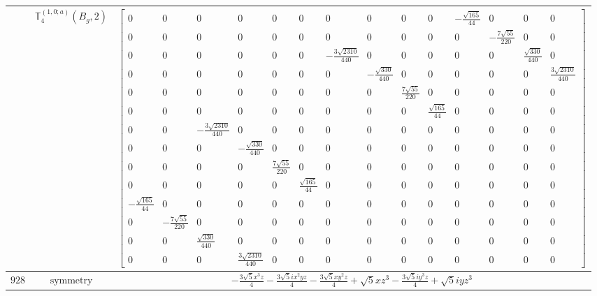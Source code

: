 \documentclass[fleqn,8pt,landscape]{jsarticle}
\begin{document}
\begin{longtable}{ccc}
$  $ & $ \mathbb{T}_{4}^{(1,0;a)}(B_{g},2) $ & $ \begin{bmatrix} 0 & 0 & 0 & 0 & 0 & 0 & 0 & 0 & 0 & 0 & - \frac{\sqrt{165}}{44} & 0 & 0 & 0 \\ 0 & 0 & 0 & 0 & 0 & 0 & 0 & 0 & 0 & 0 & 0 & - \frac{7 \sqrt{55}}{220} & 0 & 0 \\ 0 & 0 & 0 & 0 & 0 & 0 & - \frac{3 \sqrt{2310}}{440} & 0 & 0 & 0 & 0 & 0 & \frac{\sqrt{330}}{440} & 0 \\ 0 & 0 & 0 & 0 & 0 & 0 & 0 & - \frac{\sqrt{330}}{440} & 0 & 0 & 0 & 0 & 0 & \frac{3 \sqrt{2310}}{440} \\ 0 & 0 & 0 & 0 & 0 & 0 & 0 & 0 & \frac{7 \sqrt{55}}{220} & 0 & 0 & 0 & 0 & 0 \\ 0 & 0 & 0 & 0 & 0 & 0 & 0 & 0 & 0 & \frac{\sqrt{165}}{44} & 0 & 0 & 0 & 0 \\ 0 & 0 & - \frac{3 \sqrt{2310}}{440} & 0 & 0 & 0 & 0 & 0 & 0 & 0 & 0 & 0 & 0 & 0 \\ 0 & 0 & 0 & - \frac{\sqrt{330}}{440} & 0 & 0 & 0 & 0 & 0 & 0 & 0 & 0 & 0 & 0 \\ 0 & 0 & 0 & 0 & \frac{7 \sqrt{55}}{220} & 0 & 0 & 0 & 0 & 0 & 0 & 0 & 0 & 0 \\ 0 & 0 & 0 & 0 & 0 & \frac{\sqrt{165}}{44} & 0 & 0 & 0 & 0 & 0 & 0 & 0 & 0 \\ - \frac{\sqrt{165}}{44} & 0 & 0 & 0 & 0 & 0 & 0 & 0 & 0 & 0 & 0 & 0 & 0 & 0 \\ 0 & - \frac{7 \sqrt{55}}{220} & 0 & 0 & 0 & 0 & 0 & 0 & 0 & 0 & 0 & 0 & 0 & 0 \\ 0 & 0 & \frac{\sqrt{330}}{440} & 0 & 0 & 0 & 0 & 0 & 0 & 0 & 0 & 0 & 0 & 0 \\ 0 & 0 & 0 & \frac{3 \sqrt{2310}}{440} & 0 & 0 & 0 & 0 & 0 & 0 & 0 & 0 & 0 & 0 \end{bmatrix} $ \\ \hline
$ 928 $ & $ \text{symmetry} $ & $ - \frac{3 \sqrt{5} x^{3} z}{4} - \frac{3 \sqrt{5} i x^{2} y z}{4} - \frac{3 \sqrt{5} x y^{2} z}{4} + \sqrt{5} x z^{3} - \frac{3 \sqrt{5} i y^{3} z}{4} + \sqrt{5} i y z^{3} $ \\

\end{longtable}
\end{document}
